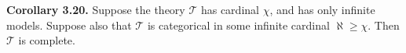 \textbf{Corollary 3.20.} Suppose the theory $\mathcal{T}$ has cardinal $\chi$, and has only infinite models. Suppose also that $\mathcal{T}$ is categorical in some infinite cardinal $\aleph \geqslant \chi$. Then $\mathcal{T}$ is complete.

